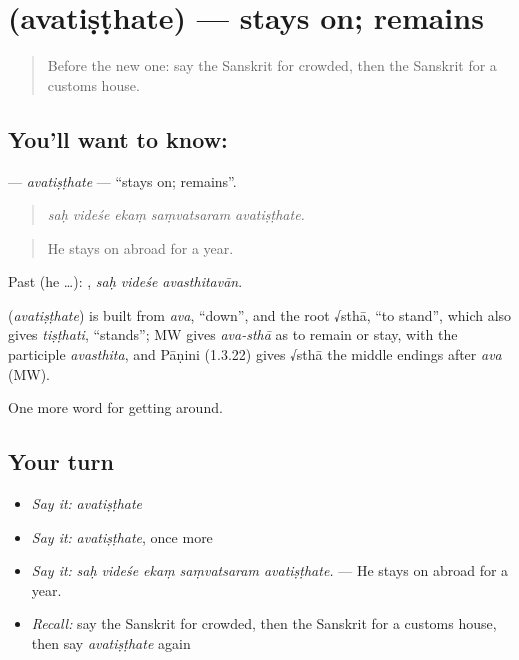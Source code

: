 \section[\texorpdfstring{\sk{अवतिष्ठते} (avatiṣṭhate)}{अवतिष्ठते (avatiṣṭhate)}]{ (avatiṣṭhate) — stays on; remains}

\label{lesson:SA-C426-avatisthate}



\begin{quote}
Before the new one: say the Sanskrit for crowded, then the Sanskrit for a customs house.
\end{quote}

\subsection*{You'll want to know: }
\textbf{} — \emph{avatiṣṭhate} — \textquotedblleft{}stays on; remains\textquotedblright{}.

\begin{quote}
    
\end{quote}

\begin{quote}
\emph{saḥ videśe ekaṃ saṃvatsaram avatiṣṭhate.}
\end{quote}

\begin{quote}
He stays on abroad for a year.
\end{quote}

Past (he …):   , \emph{saḥ videśe avasthitavān}.

\begin{cousinweb}
\textbf{} (\emph{avatiṣṭhate}) is built from \emph{ava}, \textquotedblleft{}down\textquotedblright{}, and the root √sthā, \textquotedblleft{}to stand\textquotedblright{}, which also gives \emph{tiṣṭhati}, \textquotedblleft{}stands\textquotedblright{}; MW gives \emph{ava-sthā} as to remain or stay, with the participle \emph{avasthita}, and Pāṇini (1.3.22) gives √sthā the middle endings after \emph{ava} (MW).
\end{cousinweb}

\begin{grammarlens}[title={What you've built}]
One more word for getting around.
\end{grammarlens}

\subsection*{Your turn}
\begin{itemize}
\raggedright
  \item \emph{Say it:} \emph{avatiṣṭhate}
  \item \emph{Say it:} \emph{avatiṣṭhate}, once more
  \item \emph{Say it:} \emph{saḥ videśe ekaṃ saṃvatsaram avatiṣṭhate.} — He stays on abroad for a year.
  \item \emph{Recall:} say the Sanskrit for crowded, then the Sanskrit for a customs house, then say \emph{avatiṣṭhate} again
\end{itemize}

